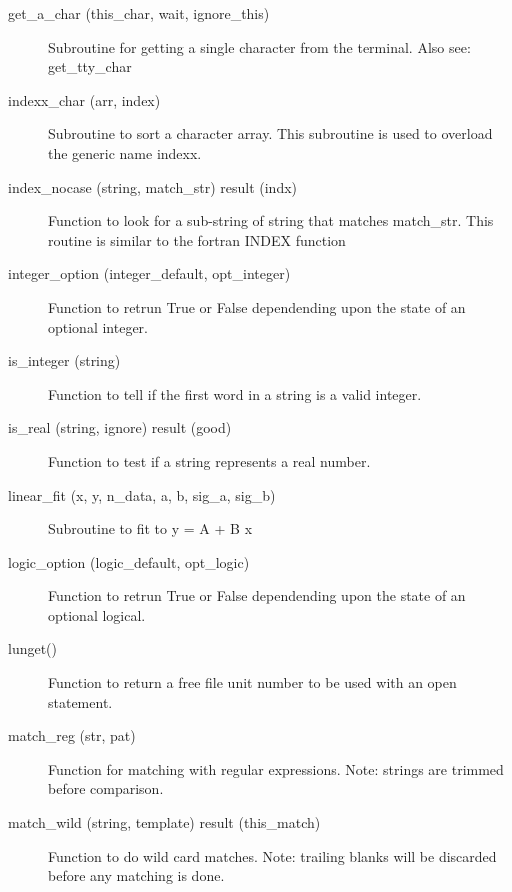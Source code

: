 \begin{description}
\item[get_a_char (this_char, wait, ignore_this)] \Newline 
Subroutine for getting a single character from the terminal.
Also see: get_tty_char

\item[indexx_char (arr, index)] \Newline 
Subroutine to sort a character array.
This subroutine is used to overload the generic name indexx.

\item[index_nocase (string, match_str) result (indx)] \Newline 
Function to look for a sub-string of string that matches match_str.
This routine is similar to the fortran INDEX function

\item[integer_option (integer_default, opt_integer)] \Newline 
Function to retrun True or False dependending upon the state of an 
optional integer.

\item[is_integer (string)] \Newline 
Function to tell if the first word in a string is a valid integer.

\item[is_real (string, ignore) result (good)] \Newline 
Function to test if a string represents a real number.

\item[linear_fit (x, y, n_data, a, b, sig_a, sig_b)] \Newline 
Subroutine to fit to y = A + B x

\item[logic_option (logic_default, opt_logic)] \Newline 
Function to retrun True or False dependending upon the state of an 
optional logical.

\item[lunget()] \Newline 
Function to return a free file unit number to be used with an open statement.

\item[match_reg (str, pat)] \Newline 
Function for matching with regular expressions.
Note: strings are trimmed before comparison.

\item[match_wild (string, template) result (this_match)] \Newline 
Function to do wild card matches. Note: trailing blanks will be discarded
before any matching is done.


\end{description}
